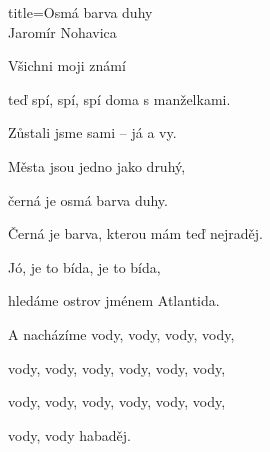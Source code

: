 \begin{song}{title=\centering Osmá barva duhy \\\normalsize Jaromír Nohavica  \vspace*{-0.3cm}}
{\begin{minipage}[t]{0.48\textwidth}
\end{minipage}\begin{minipage}[t]{0.48\textwidth}\setlength{\parindent}{0.45cm}\vspace*{0.55cm}  %

	Všichni moji známí
	
	teď spí, spí, spí doma s manželkami.

	Zůstali jsme sami -- já a vy.
	
	Města jsou jedno jako druhý,
	
	černá je osmá barva duhy.
	
	Černá je barva, kterou mám teď nejraděj.
	
	Jó, je to bída, je to bída,
	
	hledáme ostrov jménem Atlantida.
	
	A nacházíme vody, vody, vody, vody,
	
	vody, vody, vody, vody, vody, vody,
	
	vody, vody, vody, vody, vody, vody,

	vody, vody habaděj. 

\end{minipage}
}
\setcounter{Slokočet}{0}
\end{song}
